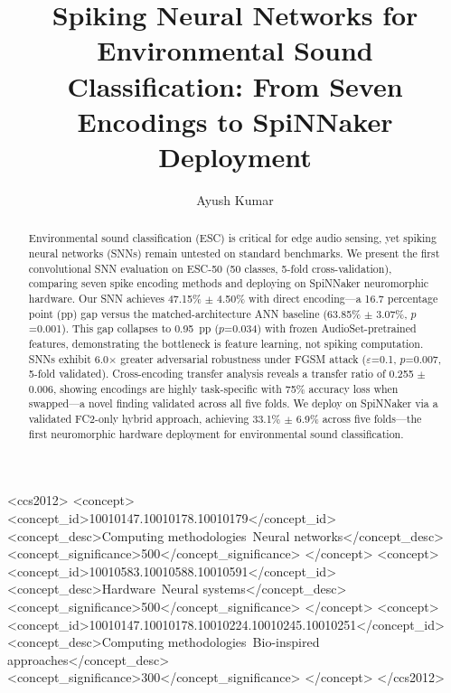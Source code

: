\documentclass[sigconf,nonacm=false]{acmart}
\begin{document}
\title{Spiking Neural Networks for Environmental Sound Classification: From Seven Encodings to SpiNNaker Deployment}

\author{Ayush Kumar}


\begin{abstract}
Environmental sound classification (ESC) is critical for edge audio sensing, yet spiking neural networks (SNNs) remain untested on standard benchmarks.
We present the first convolutional SNN evaluation on ESC-50 (50 classes, 5-fold cross-validation), comparing seven spike encoding methods and deploying on SpiNNaker neuromorphic hardware.
Our SNN achieves 47.15\% $\pm$ 4.50\% with direct encoding---a 16.7 percentage point (pp) gap versus the matched-architecture ANN baseline (63.85\% $\pm$ 3.07\%, $p$=0.001).
This gap collapses to 0.95~pp ($p$=0.034) with frozen AudioSet-pretrained features, demonstrating the bottleneck is feature learning, not spiking computation.
SNNs exhibit 6.0$\times$ greater adversarial robustness under FGSM attack ($\varepsilon$=0.1, $p$=0.007, 5-fold validated).
Cross-encoding transfer analysis reveals a transfer ratio of 0.255 $\pm$ 0.006, showing encodings are highly task-specific with 75\% accuracy loss when swapped---a novel finding validated across all five folds.
We deploy on SpiNNaker via a validated FC2-only hybrid approach, achieving 33.1\% $\pm$ 6.9\% across five folds---the first neuromorphic hardware deployment for environmental sound classification.
\end{abstract}

\begin{CCSXML}
<ccs2012>
<concept>
<concept_id>10010147.10010178.10010179</concept_id>
<concept_desc>Computing methodologies~Neural networks</concept_desc>
<concept_significance>500</concept_significance>
</concept>
<concept>
<concept_id>10010583.10010588.10010591</concept_id>
<concept_desc>Hardware~Neural systems</concept_desc>
<concept_significance>500</concept_significance>
</concept>
<concept>
<concept_id>10010147.10010178.10010224.10010245.10010251</concept_id>
<concept_desc>Computing methodologies~Bio-inspired approaches</concept_desc>
<concept_significance>300</concept_significance>
</concept>
</ccs2012>
\end{CCSXML}
\end{document}
